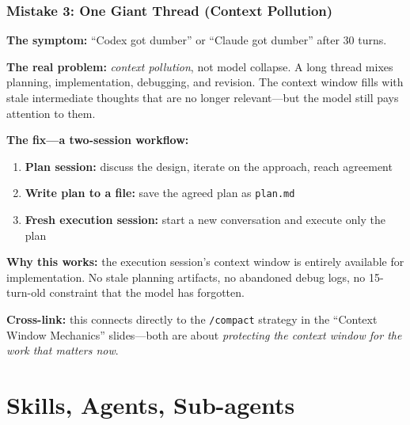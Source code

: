 \documentclass[10pt,english,aspectratio=169]{beamer}
\begin{document}
\begin{frame}
\frametitle{Mistake 3: One Giant Thread (Context Pollution)}

\textbf{The symptom:} ``Codex got dumber'' or ``Claude got dumber'' after 30 turns.

\vspace{0.2cm}

\textbf{The real problem:} \textit{context pollution}, not model collapse. A long thread mixes planning, implementation, debugging, and revision. The context window fills with stale intermediate thoughts that are no longer relevant---but the model still pays attention to them.

\vspace{0.3cm}

\textbf{The fix---a two-session workflow:}
\begin{enumerate}
    \item \textbf{Plan session:} discuss the design, iterate on the approach, reach agreement
    \item \textbf{Write plan to a file:} save the agreed plan as \texttt{plan.md}
    \item \textbf{Fresh execution session:} start a new conversation and execute only the plan
\end{enumerate}

\vspace{0.3cm}

\textbf{Why this works:} the execution session's context window is entirely available for implementation. No stale planning artifacts, no abandoned debug logs, no 15-turn-old constraint that the model has forgotten.

\vspace{0.2cm}

\textbf{Cross-link:} this connects directly to the \texttt{/compact} strategy in the ``Context Window Mechanics'' slides---both are about \textit{protecting the context window for the work that matters now}.
\end{frame}

\section{Skills, Agents, Sub-agents}
\end{document}
